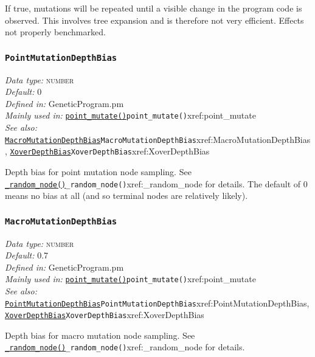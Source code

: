 \documentclass[a4paper]{article}
\begin{document}
If true, mutations will be repeated until a visible change in the
program code is observed.  This involves tree expansion and is
therefore not very efficient.  Effects not properly benchmarked.

\subsubsection{\texttt{PointMutationDepthBias}}\label{xref:PointMutationDepthBias}
\begin{flushleft}
\textit{Data type:} \textsc{number}\\
\textit{Default:} 0\\
\textit{Defined in:} GeneticProgram.pm\\
\textit{Mainly used in:} \hyperref[no]{\texttt{point\_mutate()}}{\texttt{point\_mutate()}}{xref:point_mutate}\\
\textit{See also:} \hyperref[no]{\texttt{MacroMutationDepthBias}}{\texttt{MacroMutationDepthBias}}{xref:MacroMutationDepthBias}, \hyperref[no]{\texttt{XoverDepthBias}}{\texttt{XoverDepthBias}}{xref:XoverDepthBias}
\end{flushleft}

Depth bias for point mutation node sampling.  See
\hyperref[no]{\texttt{\_random\_node()}}{\texttt{\_random\_node()}}{xref:_random_node} for details.  The default of 0 means no bias
at all (and so terminal nodes are relatively likely).

\subsubsection{\texttt{MacroMutationDepthBias}}\label{xref:MacroMutationDepthBias}
\begin{flushleft}
\textit{Data type:} \textsc{number}\\
\textit{Default:} 0.7\\
\textit{Defined in:} GeneticProgram.pm\\
\textit{Mainly used in:} \hyperref[no]{\texttt{point\_mutate()}}{\texttt{point\_mutate()}}{xref:point_mutate}\\
\textit{See also:} \hyperref[no]{\texttt{PointMutationDepthBias}}{\texttt{PointMutationDepthBias}}{xref:PointMutationDepthBias}, \hyperref[no]{\texttt{XoverDepthBias}}{\texttt{XoverDepthBias}}{xref:XoverDepthBias}
\end{flushleft}

Depth bias for macro mutation node sampling.  See
\hyperref[no]{\texttt{\_random\_node()}}{\texttt{\_random\_node()}}{xref:_random_node} for details.
\end{document}
